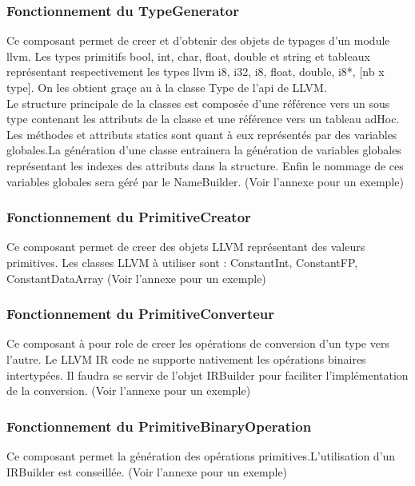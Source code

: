 \documentclass{report}
\begin{document}
   \subsubsection{Fonctionnement du TypeGenerator}
   Ce composant permet de creer et d'obtenir des objets de typages d'un module llvm.
   Les types primitifs bool, int, char, float, double et string et tableaux représentant respectivement les types 
   llvm i8, i32, i8, float, double, i8*, [nb x type]. On les obtient graçe au à la classe Type de l'api de LLVM.
   \\
   Le structure principale de la classes est composée d'une référence vers un sous type contenant les
   attributs de la classe et une référence vers un tableau adHoc. Les méthodes et attributs statics 
   sont quant à eux représentés par des variables globales.La génération d'une classe entrainera 
   la génération de variables globales représentant les indexes des attributs dans la structure.
   Enfin le nommage de ces variables globales sera géré par le NameBuilder.
    \small{(Voir l'annexe pour un exemple)}

   \subsubsection{Fonctionnement du PrimitiveCreator}
   Ce composant permet de creer des objets LLVM représentant des valeurs primitives.
   Les classes LLVM à utiliser sont : ConstantInt, ConstantFP, ConstantDataArray
   \small{(Voir l'annexe pour un exemple)}

   \subsubsection{Fonctionnement du PrimitiveConverteur}
   Ce composant à pour role de creer les opérations de conversion d'un type vers l'autre. Le LLVM IR code ne supporte nativement les opérations binaires intertypées. Il faudra se servir de l'objet IRBuilder pour faciliter l'implémentation de la conversion.
   \small{(Voir l'annexe pour un exemple)}

   \subsubsection{Fonctionnement du PrimitiveBinaryOperation}
   Ce composant permet la génération des opérations primitives.L'utilisation d'un IRBuilder est conseillée.
   \small{(Voir l'annexe pour un exemple)}
\end{document}
